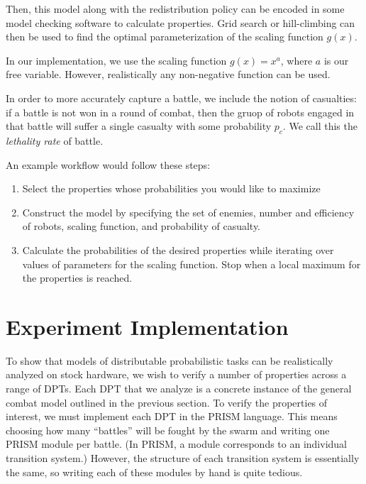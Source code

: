 \documentclass[11pt]{article}
\theoremstyle{definition}
\begin{document}
Then, this model along with the redistribution
policy can be encoded in some model checking software
to calculate properties. Grid search or hill-climbing can
then be used to find the optimal parameterization of
the scaling function $g(x)$.

In our implementation, we use the scaling function $g(x) = x^a$,
where $a$ is our free variable.
However, realistically any non-negative function can be used.

In order to more accurately capture a battle, we include the notion of
casualties:
if a battle is not won in a round of combat, then the gruop of robots engaged
in that battle will suffer a single casualty with some probability $p_c$.
We call this the \emph{lethality rate} of battle.

An example workflow would follow these steps:
%
\begin{enumerate}
    \item
        Select the properties whose probabilities you would like to maximize
    \item
        Construct the model by specifying the set of enemies, number and
        efficiency of robots, scaling function, and probability of casualty.
    \item
        Calculate the probabilities of the desired properties while iterating
        over values of parameters for the scaling function.
        Stop when a local maximum for the properties is reached.
\end{enumerate}

\section{Experiment Implementation}
\label{sec:implementation}

To show that models of distributable probabilistic tasks can be realistically
analyzed on stock hardware, we wish to verify a number of properties across a
range of DPTs.
Each DPT that we analyze is a concrete instance of the general combat model
outlined in the previous section.
To verify the properties of interest, we must implement each DPT in the PRISM
language.
This means choosing how many ``battles'' will be fought by the swarm and
writing one PRISM module per battle.
(In PRISM, a module corresponds to an individual transition system.)
However, the structure of each transition system is essentially the same, so
writing each of these modules by hand is quite tedious.
\end{document}
